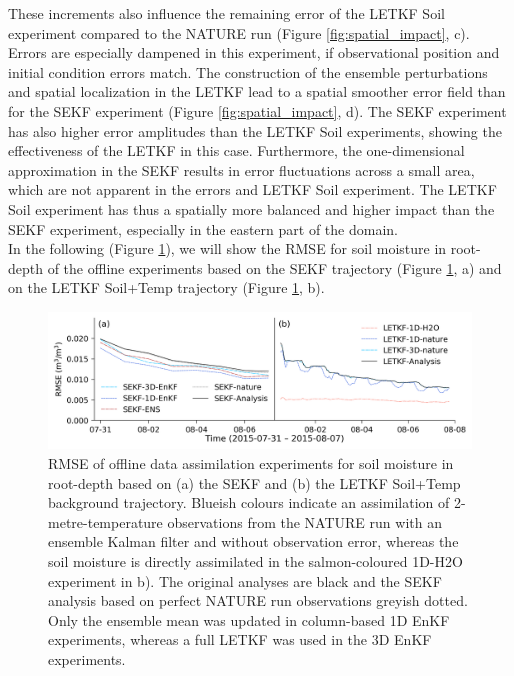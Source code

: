 \documentclass[hess, manuscript]{copernicus}
\begin{document}
These increments also influence the remaining error of the LETKF Soil experiment compared to the NATURE run (Figure \ref{fig:spatial_impact}, c).
Errors are especially dampened in this experiment, if observational position and initial condition errors match.
The construction of the ensemble perturbations \citep{hunt_efficient_2007} and spatial localization in the LETKF lead to a spatial smoother error field than for the SEKF experiment (Figure \ref{fig:spatial_impact}, d).
The SEKF experiment has also higher error amplitudes than the LETKF Soil experiments, showing the effectiveness of the LETKF in this case.
Furthermore, the one-dimensional approximation in the SEKF results in error fluctuations across a small area, which are not apparent in the errors and LETKF Soil experiment.
The LETKF Soil experiment has thus a spatially more balanced and higher impact than the SEKF experiment, especially in the eastern part of the domain.\\

In the following (Figure \ref{fig:offline_exp}), we will show the RMSE for soil moisture in root-depth of the offline experiments based on the SEKF trajectory (Figure \ref{fig:offline_exp}, a) and on the LETKF Soil+Temp trajectory (Figure \ref{fig:offline_exp}, b).

\begin{figure}[ht]
	\includegraphics{figures/fig_07_offline_exp.png}
	\caption{
		RMSE of offline data assimilation experiments for soil moisture in root-depth based on (a) the SEKF and (b) the LETKF Soil+Temp background trajectory.
		Blueish colours indicate an assimilation of 2-metre-temperature observations from the NATURE run with an ensemble Kalman filter and without observation error, whereas the soil moisture is directly assimilated in the salmon-coloured 1D-H2O experiment in b).
		The original analyses are black and the SEKF analysis based on perfect NATURE run observations greyish dotted.
		Only the ensemble mean was updated in column-based 1D EnKF experiments, whereas a full LETKF was used in the 3D EnKF experiments.
	}
	\label{fig:offline_exp}
\end{figure}
\end{document}
